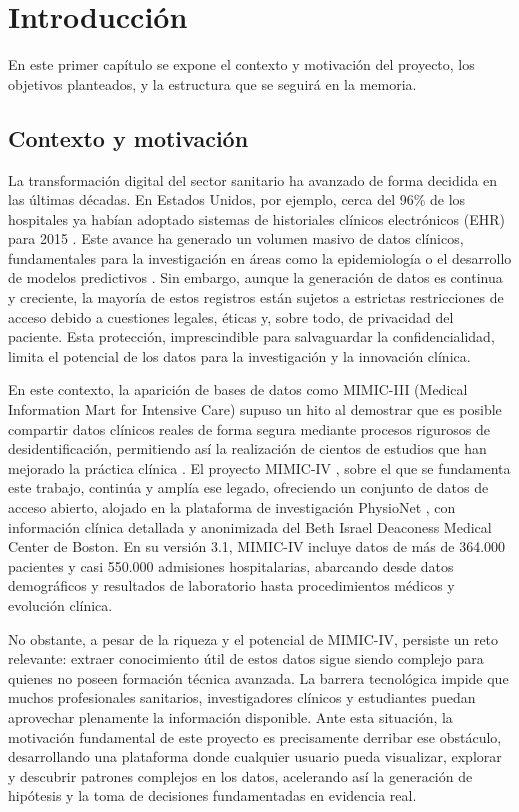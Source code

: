 \chapter{Introducción}

En este primer capítulo se expone el contexto y motivación del proyecto, los objetivos planteados, y la estructura que se seguirá en la memoria.

\section{Contexto y motivación}

La transformación digital del sector sanitario ha avanzado de forma decidida en las últimas décadas. En Estados Unidos, por ejemplo, cerca del 96\% de los hospitales ya habían adoptado sistemas de historiales clínicos electrónicos (EHR) para 2015 \cite{Henry2016_EHR}. Este avance ha generado un volumen masivo de datos clínicos, fundamentales para la investigación en áreas como la epidemiología o el desarrollo de modelos predictivos \cite{Halevy2009_data}. Sin embargo, aunque la generación de datos es continua y creciente, la mayoría de estos registros están sujetos a estrictas restricciones de acceso debido a cuestiones legales, éticas y, sobre todo, de privacidad del paciente. Esta protección, imprescindible para salvaguardar la confidencialidad, limita el potencial de los datos para la investigación y la innovación clínica.

En este contexto, la aparición de bases de datos como MIMIC-III (Medical Information Mart for Intensive Care) supuso un hito al demostrar que es posible compartir datos clínicos reales de forma segura mediante procesos rigurosos de desidentificación, permitiendo así la realización de cientos de estudios que han mejorado la práctica clínica \cite{MIMICIII_paper}. El proyecto MIMIC-IV \cite{MIMICIV_paper, MIMICIV_dataset}, sobre el que se fundamenta este trabajo, continúa y amplía ese legado, ofreciendo un conjunto de datos de acceso abierto, alojado en la plataforma de investigación PhysioNet \cite{PhysioNet_paper}, con información clínica detallada y anonimizada del Beth Israel Deaconess Medical Center de Boston. En su versión 3.1, MIMIC-IV incluye datos de más de 364.000 pacientes y casi 550.000 admisiones hospitalarias, abarcando desde datos demográficos y resultados de laboratorio hasta procedimientos médicos y evolución clínica.

No obstante, a pesar de la riqueza y el potencial de MIMIC-IV, persiste un reto relevante: extraer conocimiento útil de estos datos sigue siendo complejo para quienes no poseen formación técnica avanzada. La barrera tecnológica impide que muchos profesionales sanitarios, investigadores clínicos y estudiantes puedan aprovechar plenamente la información disponible. Ante esta situación, la motivación fundamental de este proyecto es precisamente derribar ese obstáculo, desarrollando una plataforma donde cualquier usuario pueda visualizar, explorar y descubrir patrones complejos en los datos, acelerando así la generación de hipótesis y la toma de decisiones fundamentadas en evidencia real.

